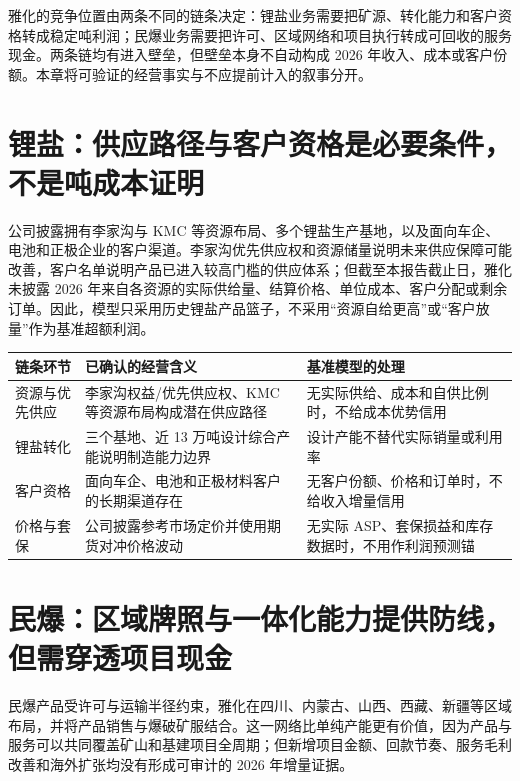 雅化的竞争位置由两条不同的链条决定：锂盐业务需要把矿源、转化能力和客户资格转成稳定吨利润；民爆业务需要把许可、区域网络和项目执行转成可回收的服务现金。两条链均有进入壁垒，但壁垒本身不自动构成 2026 年收入、成本或客户份额。本章将可验证的经营事实与不应提前计入的叙事分开。

\section{锂盐：供应路径与客户资格是必要条件，不是吨成本证明}

公司披露拥有李家沟与 KMC 等资源布局、多个锂盐生产基地，以及面向车企、电池和正极企业的客户渠道。李家沟优先供应权和资源储量说明未来供应保障可能改善，客户名单说明产品已进入较高门槛的供应体系；但截至本报告截止日，雅化未披露 2026 年来自各资源的实际供给量、结算价格、单位成本、客户分配或剩余订单。因此，模型只采用历史锂盐产品篮子，不采用“资源自给更高”或“客户放量”作为基准超额利润。

\begin{exhibitbox}[表 6-1：雅化锂盐链条的估值权限]
\begin{tabularx}{\exhibitboxwidth}{L{2.9cm}X X}
\toprule
链条环节 & 已确认的经营含义 & 基准模型的处理 \\
\midrule
资源与优先供应 & 李家沟权益/优先供应权、KMC 等资源布局构成潜在供应路径 & 无实际供给、成本和自供比例时，不给成本优势信用 \\
锂盐转化 & 三个基地、近 13 万吨设计综合产能说明制造能力边界 & 设计产能不替代实际销量或利用率 \\
客户资格 & 面向车企、电池和正极材料客户的长期渠道存在 & 无客户份额、价格和订单时，不给收入增量信用 \\
价格与套保 & 公司披露参考市场定价并使用期货对冲价格波动 & 无实际 ASP、套保损益和库存数据时，不用作利润预测锚 \\
\bottomrule
\end{tabularx}
\end{exhibitbox}

\section{民爆：区域牌照与一体化能力提供防线，但需穿透项目现金}

民爆产品受许可与运输半径约束，雅化在四川、内蒙古、山西、西藏、新疆等区域布局，并将产品销售与爆破矿服结合。这一网络比单纯产能更有价值，因为产品与服务可以共同覆盖矿山和基建项目全周期；但新增项目金额、回款节奏、服务毛利改善和海外扩张均没有形成可审计的 2026 年增量证据。

